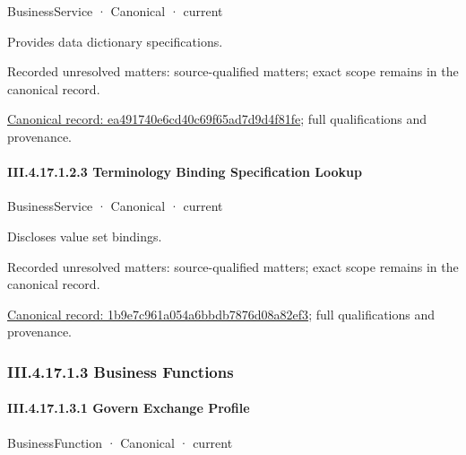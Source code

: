 \label{element:ea491740e6cd40c69f65ad7d9d4f81fe}
{\small BusinessService · Canonical · current}\par

Provides data dictionary specifications.


{\small Recorded unresolved matters: source-qualified matters; exact scope remains in the canonical record.}\par
{\footnotesize \href{../../../../../../../continuum/business/business-service/ea491740e6cd40c69f65ad7d9d4f81fe.md}{Canonical record: ea491740e6cd40c69f65ad7d9d4f81fe}; full qualifications and provenance.}\par
\paragraph*{III.4.17.1.2.3 Terminology Binding Specification Lookup}
\label{navigation:III.4.17.1.2.3}

\label{element:1b9e7c961a054a6bbdb7876d08a82ef3}
{\small BusinessService · Canonical · current}\par

Discloses value set bindings.


{\small Recorded unresolved matters: source-qualified matters; exact scope remains in the canonical record.}\par
{\footnotesize \href{../../../../../../../continuum/business/business-service/1b9e7c961a054a6bbdb7876d08a82ef3.md}{Canonical record: 1b9e7c961a054a6bbdb7876d08a82ef3}; full qualifications and provenance.}\par
\subsubsection*{III.4.17.1.3 Business Functions}
\label{navigation:III.4.17.1.3}

\paragraph*{III.4.17.1.3.1 Govern Exchange Profile}
\label{navigation:III.4.17.1.3.1}

\label{element:935f9a62438944599b913f2614c9e595}
{\small BusinessFunction · Canonical · current}\par

